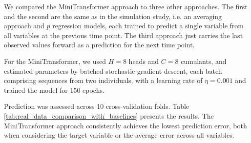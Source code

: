 \documentclass[AMA,Times1COL]{WileyNJDv5} %
\begin{document}
We compared the MiniTransformer approach to three other approaches. The first and the second are the same as in the simulation study, i.e. an averaging approach and \(p\) regression models, each trained to predict a single variable from all variables at the previous time point. The third approach just carries the last observed values forward as a prediction for the next time point. 

For the MiniTransformer, we used \(H = 8 \) heads and \(C = 8\) cumulants, and estimated parameters by batched stochastic gradient descent, each batch comprising sequences from two individuals, with a learning rate of \(\eta = 0.001 \) and trained the model for 150 epochs. 

Prediction was assessed across 10 cross-validation folds. Table \ref{tab:real_data_comparison_with_baselines} presents the results. The MiniTransformer approach consistently achieves the lowest prediction error, both when considering the target variable or the average error across all variables. %
\end{document}
